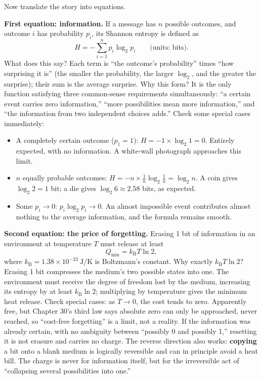 
Now translate the story into equations.

\textbf{First equation: information.} If a message has $n$ possible outcomes, and outcome $i$ has probability $p_i$, its Shannon entropy is defined as
\[
H=-\sum_{i=1}^{n}p_i\log_2 p_i \qquad \text{(units: bits)}.
\]
What does this say? Each term is ``the outcome's probability'' times ``how surprising it is'' (the smaller the probability, the larger $\log_2$, and the greater the surprise); their sum is the average surprise. Why this form? It is the only function satisfying three common-sense requirements simultaneously: ``a certain event carries zero information,'' ``more possibilities mean more information,'' and ``the information from two independent choices adds.'' Check some special cases immediately:

\begin{itemize}[leftmargin=2em]
\item A completely certain outcome ($p_1=1$): $H=-1\times\log_2 1=0$. Entirely expected, with no information. A white-wall photograph approaches this limit.
\item $n$ equally probable outcomes: $H=-n\times\frac1n\log_2\frac1n=\log_2 n$. A coin gives $\log_2 2=1$ bit; a die gives $\log_2 6\approx2.58$ bits, as expected.
\item Some $p_i\to 0$: $p_i\log_2 p_i\to 0$. An almost impossible event contributes almost nothing to the average information, and the formula remains smooth.
\end{itemize}

\textbf{Second equation: the price of forgetting.} Erasing 1 bit of information in an environment at temperature $T$ must release at least
\[
Q_{\min}=k_{\mathrm{B}}T\ln 2 ,
\]
where $k_{\mathrm{B}}=1.38\times10^{-23}\ \mathrm{J/K}$ is Boltzmann's constant. Why exactly $k_{\mathrm{B}}T\ln 2$? Erasing 1 bit compresses the medium's two possible states into one. The environment must receive the degree of freedom lost by the medium, increasing its entropy by at least $k_{\mathrm{B}}\ln 2$; multiplying by temperature gives the minimum heat release. Check special cases: as $T\to 0$, the cost tends to zero. Apparently free, but Chapter 30's third law says absolute zero can only be approached, never reached, so ``cost-free forgetting'' is a limit, not a reality. If the information was already certain, with no ambiguity between ``possibly 0 and possibly 1,'' resetting it is not erasure and carries no charge. The reverse direction also works: \textbf{copying} a bit onto a blank medium is logically reversible and can in principle avoid a heat bill. The charge is never for information itself, but for the irreversible act of ``collapsing several possibilities into one.''

